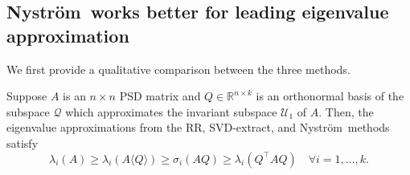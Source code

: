 \documentclass[onefignum,onetabnum]{siamart251216}
\def\subspace{\mathcal{Q}}
\def\Nystrom{Nystr{\"o}m}
\def\svdmethod{SVD-extract}
\def\leadingsubspace{\mathcal{U}_1}
\begin{document}
\subsection{\Nystrom\ works better for leading eigenvalue approximation}
\label{subsec:Leading-eigenvalue-subsection}
We first provide a qualitative comparison between the three methods.
\begin{theorem}
    \label{thm:Nystom-vs-SVD-vs-RR-Theorem}
    Suppose $A$ is an $n \times n$ PSD matrix and $Q\in\mathbb{R}^{n\times k}$ is an orthonormal basis of the subspace $\subspace$ which approximates the invariant subspace $\leadingsubspace$ of $A$. Then, the eigenvalue approximations from the RR, \svdmethod, and \Nystrom\ methods satisfy  
    \begin{equation}
        \label{eq:Nystrom-vs-SVD-vs-RR}
        \lambda_i(A) \geq \lambda_i(A\langle Q \rangle) \geq \sigma_i(AQ) \geq \lambda_i(Q^\top A Q) \quad \forall i = 1,\ldots, k.
    \end{equation}
\end{theorem}
\end{document}
